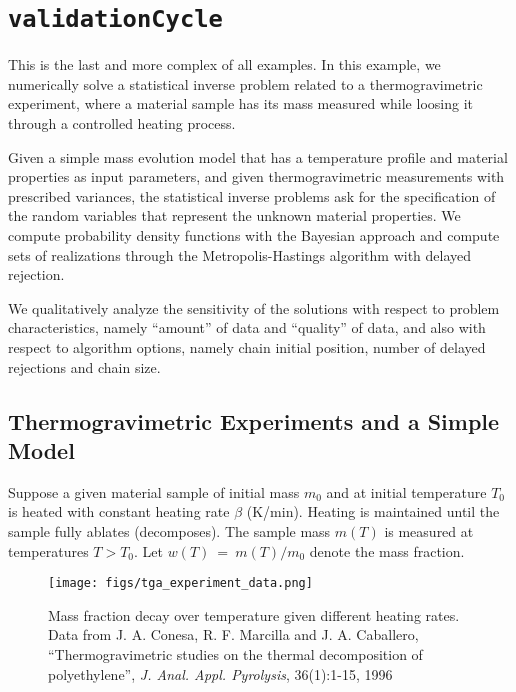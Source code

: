 \section{\texttt{validationCycle}}\label{sec:example_tga}

This is the last and more complex of all \Queso{} examples.
In this example, we numerically solve a statistical inverse problem related to a thermogravimetric experiment, where a material sample has its mass measured while loosing it through a controlled heating process.

Given a simple mass evolution model that has a temperature profile and material
properties as input parameters, and given thermogravimetric measurements with
prescribed variances, the statistical inverse problems ask for the
specification of the random variables that represent the unknown material
properties. We compute probability density functions with the Bayesian approach
and compute sets of realizations through the Metropolis-Hastings algorithm with
delayed rejection.

We qualitatively analyze the sensitivity of the solutions with respect to
problem characteristics, namely ``amount'' of data and ``quality'' of data, and
also with respect to algorithm options, namely chain initial position, number
of delayed rejections
and chain size.




\subsection{Thermogravimetric Experiments and a Simple Model}

Suppose a given material sample of initial mass $m_0$ and at initial temperature $T_0$ is heated with constant heating rate $\beta$ (K/min). Heating is maintained until the sample fully ablates (decomposes). The sample mass $m(T)$ is measured at temperatures $T>T_0$.
Let $w(T)~=~m(T)/m_0$ denote the mass fraction.

%
\begin{figure}[!ht]
\centering
\texttt{[image: figs/tga\_experiment\_data.png]}
\vspace*{-8pt}
\caption{Mass fraction decay over temperature given different heating rates. Data from J. A. Conesa, R. F. Marcilla and J. A. Caballero, ``Thermogravimetric studies on the thermal decomposition of polyethylene'', {\it J. Anal. Appl. Pyrolysis}, 36(1):1-15, 1996}
\label{fig:tga-exp-data}
\end{figure}


